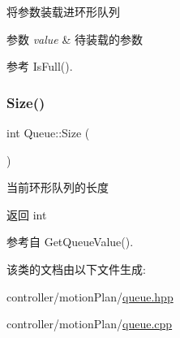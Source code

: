将参数装载进环形队列 


\begin{DoxyParams}{参数}
{\em value} & 待装载的参数 \\
\hline
\end{DoxyParams}


参考 Is\+Full().

\mbox{\label{classquadruped_1_1Queue_a85ba36eb05d9fc729e1949b1f3702e12}} 
\subsubsection{\texorpdfstring{Size()}{Size()}}
{\footnotesize\ttfamily int Queue\+::\+Size (\begin{DoxyParamCaption}\item[{void}]{ }\end{DoxyParamCaption})}



当前环形队列的长度 

\begin{DoxyReturn}{返回}
int 
\end{DoxyReturn}


参考自 Get\+Queue\+Value().



该类的文档由以下文件生成\+:\begin{DoxyCompactItemize}
\item 
controller/motion\+Plan/\hyperlink{queue_8hpp}{queue.\+hpp}\item 
controller/motion\+Plan/\hyperlink{queue_8cpp}{queue.\+cpp}\end{DoxyCompactItemize}
